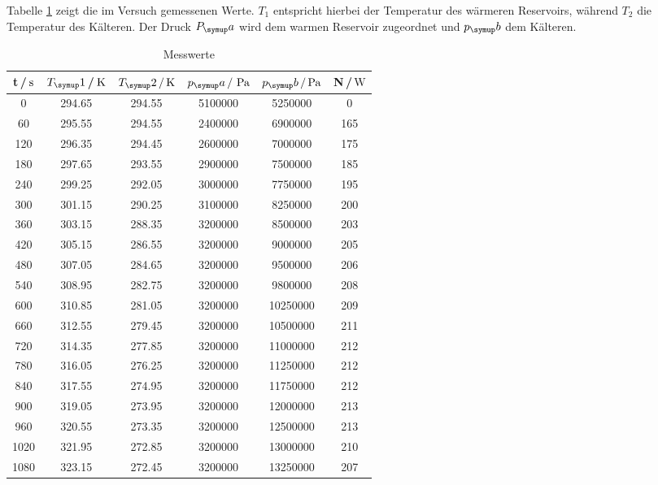 Tabelle \ref{tab:messwerte} zeigt die im Versuch gemessenen Werte.
$T_1$ entspricht hierbei der Temperatur des wärmeren Reservoirs, während $T_2$
die Temperatur des Kälteren. Der Druck $P_\su{a}$ wird dem warmen Reservoir
zugeordnet und $p_\su{b}$ dem Kälteren.
\begin{table}[h]
  \centering
  \begin{tabular}{c c c c c c}
    \toprule
    t\,/$\,\si{\second}$ &$T_\su{1}$\,/$\,\si{\kelvin}$ & $T_\su{2}\,/\Kel$ & $p_\su{a}\,/\,\pas $ &
    $p_\su{b}\,/ \pas$ & N\,/$\,\si{\watt}$  \\
    \midrule
       0   &   294.65   &   294.55   &   5100000    &     5250000   &      0 \\
      60   &   295.55   &   294.55   &   2400000    &     6900000   &    165 \\
     120   &   296.35   &   294.45   &   2600000    &     7000000   &    175 \\
     180   &   297.65   &   293.55   &   2900000    &     7500000   &    185 \\
     240   &   299.25   &   292.05   &   3000000    &     7750000   &    195 \\
     300   &   301.15   &   290.25   &   3100000    &     8250000   &    200 \\
     360   &   303.15   &   288.35   &   3200000    &     8500000   &    203 \\
     420   &   305.15   &   286.55   &   3200000    &     9000000   &    205 \\
     480   &   307.05   &   284.65   &   3200000    &     9500000   &    206 \\
     540   &   308.95   &   282.75   &   3200000    &     9800000   &    208 \\
     600   &   310.85   &   281.05   &   3200000    &    10250000   &    209 \\
     660   &   312.55   &   279.45   &   3200000    &    10500000   &    211 \\
     720   &   314.35   &   277.85   &   3200000    &    11000000   &    212 \\
     780   &   316.05   &   276.25   &   3200000    &    11250000   &    212 \\
     840   &   317.55   &   274.95   &   3200000    &    11750000   &    212 \\
     900   &   319.05   &   273.95   &   3200000    &    12000000   &    213 \\
     960   &   320.55   &   273.35   &   3200000    &    12500000   &    213 \\
    1020   &   321.95   &   272.85   &   3200000    &    13000000   &    210 \\
    1080   &   323.15   &   272.45   &   3200000    &    13250000   &    207 \\
    \bottomrule
  \end{tabular}
  \caption{Messwerte}
  \label{tab:messwerte}
\end{table}
